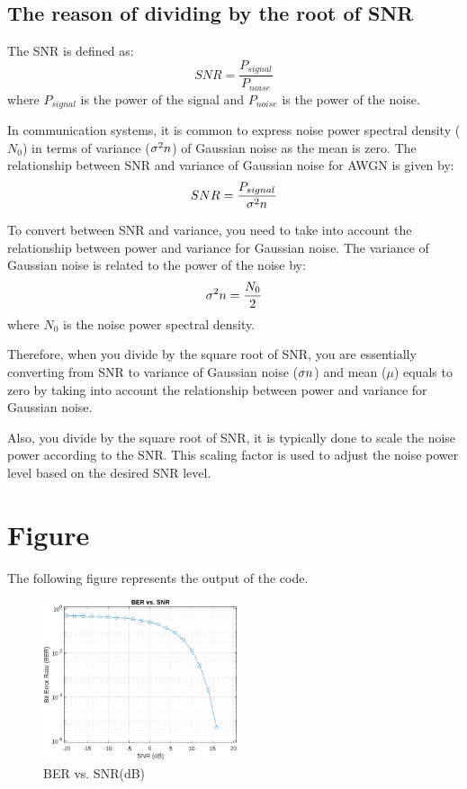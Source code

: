 \documentclass{article}
\begin{document}
 	\subsection{The reason of dividing by the root of SNR}
 	The SNR is defined as:
 	\begin{equation}
 		{SNR} = \frac{P_{{signal}}}{P_{{noise}}}
 	\end{equation}
 	where $P_{{signal}}$ is the power of the signal and $P_{{noise}}$ is the power of the noise.
 	
 	In communication systems, it is common to express noise power spectral density ($N_0$) in terms of variance ($\sigma^2{\small{n}}$) of Gaussian noise as the mean is zero. 
 	The relationship between SNR and variance of Gaussian noise for AWGN is given by:
 	\begin{equation}
 		{SNR} = \frac{P_{{signal}}}{\sigma^2{\small{n}}}
 	\end{equation}
 	
 	To convert between SNR and variance, you need to take into account the relationship between power and variance for Gaussian noise. The variance of Gaussian noise is related to the power of the noise by:
 	\begin{equation}
 		\sigma^2{\small{n}} = \frac{N_0}{2}
 	\end{equation}
 	where $N_0$ is the noise power spectral density.
 	
 	Therefore, when you divide by the square root of SNR, you are essentially converting from SNR to variance of Gaussian noise ($\sigma{\small{n}}$) and mean ($\mu$) equals to zero by taking into account the relationship between power and variance for Gaussian noise.
 	
 	Also, you divide by the square root of SNR, it is typically done to scale the noise power according to the SNR. This scaling factor is used to adjust the noise power level based on the desired SNR level.
	 	
	\section{Figure}
	The following figure represents the output of the code.
		\begin{figure}[h]
			\centering
			\includegraphics[width=0.51\textwidth]{lab_digital1.png}
			\caption{BER vs. SNR(dB)}
			\label{fig:plot}
		\end{figure}
\end{document}
